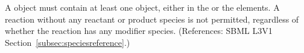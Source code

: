 A \Reaction object must contain at least one \SpeciesReference object,
either in the  or the 
elements.  A reaction without any reactant or product species is not
permitted, regardless of whether the reaction has any modifier species.
(References: SBML L3V1 Section~\ref{subsec:speciesreference}.)
